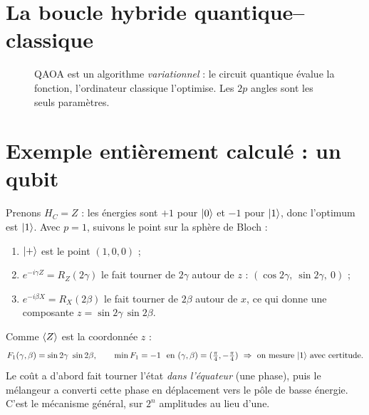 \section{La boucle hybride quantique--classique}
\begin{figure}[htbp]
\centering
{}
\caption{QAOA est un algorithme \emph{variationnel} : le circuit quantique évalue la fonction, l'ordinateur classique l'optimise. Les $2p$ angles sont les seuls paramètres.}\label{fig:boucle-hybride}
\end{figure}

\section{Exemple entièrement calculé : un qubit}
Prenons $H_C=Z$ : les énergies sont $+1$ pour $\lvert 0\rangle$ et $-1$ pour $\lvert 1\rangle$, donc l'optimum est $\lvert 1\rangle$. Avec $p=1$, suivons le point sur la sphère de Bloch :
\begin{enumerate}
\item $\lvert +\rangle$ est le point $(1,0,0)$ ;
\item $e^{-i\gamma Z}=R_Z(2\gamma)$ le fait tourner de $2\gamma$ autour de $z$ : $(\cos2\gamma,\ \sin2\gamma,\ 0)$ ;
\item $e^{-i\beta X}=R_X(2\beta)$ le fait tourner de $2\beta$ autour de $x$, ce qui donne une composante $z=\sin2\gamma\,\sin2\beta$.
\end{enumerate}
Comme $\langle Z\rangle$ est la coordonnée $z$ :
\[F_1(\gamma,\beta)=\sin2\gamma\ \sin2\beta,\qquad \min F_1=-1\ \text{ en }(\gamma,\beta)=(\tfrac\pi4,-\tfrac\pi4)\ \Rightarrow\ \text{on mesure }\ket1\text{ avec certitude}.\]
Le coût a d'abord fait tourner l'état \emph{dans l'équateur} (une phase), puis le mélangeur a converti cette phase en déplacement vers le pôle de basse énergie. C'est le mécanisme général, sur $2^n$ amplitudes au lieu d'une.

